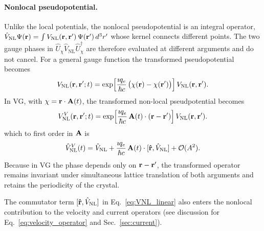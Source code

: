 \paragraph{Nonlocal pseudopotential.}
Unlike the local potentials, the nonlocal pseudopotential is an integral operator,
$\hat V_{\mathrm{NL}}\Psi(\vb r) = \int V_{\mathrm{NL}}(\vb r,\vb r')\,\Psi(\vb r')\,d^3r'$
whose kernel connects different points. 
The two gauge phases in $\hat U_\chi\hat V_{\mathrm{NL}}\hat U_\chi^\dagger$ are
therefore evaluated at different arguments and do not cancel.
For a  general  gauge function  the transformed  pseudopotential becomes
\begin{equation}
  V_{\mathrm{NL}}(\vb r,\vb r';t)
	= \exp\!\left[\frac{\imath q_e}{\hbar c}\, \big(\chi(\vb r) -\chi(\vb r') \big)\right]
    V_{\mathrm{NL}}(\vb r,\vb r') .
  \label{eq:VNL_general}
\end{equation}
In VG, with $\chi = \vb r\cdot\vb A(t)$, the transformed  non-local pseudpotential becomes
\begin{equation}
  V^{V}_{\mathrm{NL}}(\vb r,\vb r';t)
  = \exp\!\left[\frac{\imath q_e}{\hbar c}\,\vb A(t)\cdot(\vb r-\vb r')\right]
    V_{\mathrm{NL}}(\vb r,\vb r') .
  \label{eq:VNL_kernel}
\end{equation}
which  to first order in $\vb A$ is
\begin{equation}
  \hat V^{V}_{\mathrm{NL}}(t)
  = \hat V_{\mathrm{NL}}
  + \frac{\imath q_e}{\hbar c}\,\vb A(t)\cdot[\vb{\hat r},\hat V_{\mathrm{NL}}]
  + \mathcal{O}(A^2).
  \label{eq:VNL_linear}
\end{equation}
Because in VG the phase depends only on $\vb r-\vb r'$, the transformed operator
remains invariant under simultaneous lattice translation of both arguments and
retains the periodicity of the crystal.

The commutator term $[\vb{\hat r},\hat V_{\mathrm{NL}}] $  in Eq.~\eqref{eq:VNL_linear} also  enters the
nonlocal contribution to the velocity and current operators (see discussion  for Eq.~\eqref{eq:velocity_operator}
and Sec.~\ref{sec:current}). 

